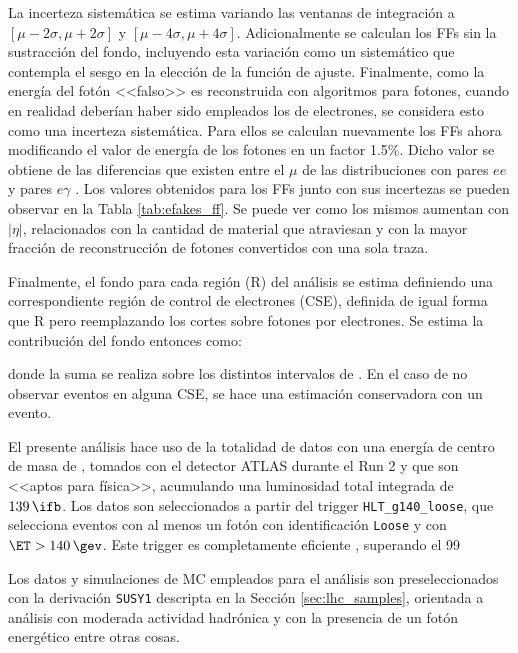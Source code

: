 La incerteza sistemática se estima variando las ventanas de integración a $[\mu - 2\sigma, \mu + 2\sigma]$ y $[\mu - 4\sigma, \mu + 4\sigma]$. Adicionalmente se calculan los FFs sin la sustracción del fondo, incluyendo esta variación como un sistemático que contempla el sesgo en la elección de la función de ajuste. Finalmente, como la energía del fotón <<falso>> es reconstruida con algoritmos para fotones, cuando en realidad deberían haber sido empleados los de electrones, se considera esto como una incerteza sistemática. Para ellos se calculan nuevamente los FFs ahora modificando el valor de energía de los fotones en un factor 1.5\%. Dicho valor se obtiene de las diferencias que existen entre el $\mu$ de las distribuciones con pares $ee$ y pares $e\gamma$ \cite{EXOT-2016-32}. Los valores obtenidos para los FFs junto con sus incertezas se pueden observar en la Tabla \ref{tab:efakes_ff}. Se puede ver como los mismos aumentan con $|\eta|$, relacionados con la cantidad de material que atraviesan y con la mayor fracción de reconstrucción de fotones convertidos con una sola traza.


Finalmente, el fondo para cada región (R) del análisis se estima definiendo una correspondiente región de control de electrones (CSE), definida de igual forma que R pero reemplazando los cortes sobre fotones por electrones. Se estima la contribución del fondo entonces como:



donde la suma se realiza sobre los distintos intervalos de \absEta.
En el caso de no observar eventos en alguna CSE, se hace una estimación conservadora con un evento.




El presente análisis hace uso de la totalidad de datos con una energía de centro de masa de , tomados con el detector ATLAS durante el Run 2 y que son <<aptos para física>>, acumulando una luminosidad total integrada de $139\,\ifb$. Los datos son seleccionados a partir del trigger \texttt{HLT\_g140\_loose}, que selecciona eventos con al menos un fotón con identificación \texttt{Loose} y con $\ET>140\,\gev$. Este trigger es completamente eficiente \cite{TRIG-2018-05}, superando el 99

Los datos y simulaciones de MC empleados para el análisis son preseleccionados con la derivación \texttt{SUSY1} descripta en la Sección \ref{sec:lhc_samples}, orientada a análisis con moderada actividad hadrónica y con la presencia de un fotón energético entre otras cosas.

